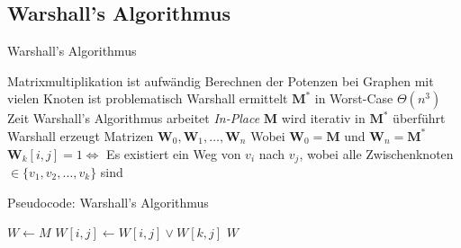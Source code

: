 \documentclass[mathserif]{beamer}
\begin{document}
\subsection{Warshall's Algorithmus}
\begin{frame}{Warshall's Algorithmus}
    \begin{outline}
        \1 Matrixmultiplikation ist aufwändig
        \2 Berechnen der Potenzen bei Graphen mit vielen Knoten ist problematisch
        \1 Warshall ermittelt $\mathbf{M}^*$ in Worst-Case $\Theta(n^3)$ Zeit
        \1 Warshall's Algorithmus arbeitet \textit{In-Place}
        \2 $\mathbf{M}$ wird iterativ in $\mathbf{M}^*$ überführt
        \1 Warshall erzeugt Matrizen $\mathbf{W}_0,\mathbf{W}_1,\dots,\mathbf{W}_n$
        \2 Wobei $\mathbf{W}_0=\mathbf{M}$ und $\mathbf{W}_n=\mathbf{M}^*$
        \1 $\mathbf{W}_k[i,j]=1\Longleftrightarrow$ Es existiert ein Weg von $v_i$ nach $v_j$, wobei alle Zwischenknoten $\in\{v_1,v_2,\dots,v_k\}$ sind
    \end{outline}
\end{frame}
\begin{frame}{Pseudocode: Warshall's Algorithmus}
    \begin{algorithm}[H]
        \caption{Warshall's Algorithmus}
        \begin{algorithmic}[1]
                \State $W\gets M$
                                \State $W[i,j]\gets W[i,j]\lor W[k,j]$
                            \EndFor
                        \EndIf
                    \EndFor
                \EndFor
                \State \Return $W$
            \EndFunction
        \end{algorithmic}
    \end{algorithm}
\end{frame}
\end{document}
